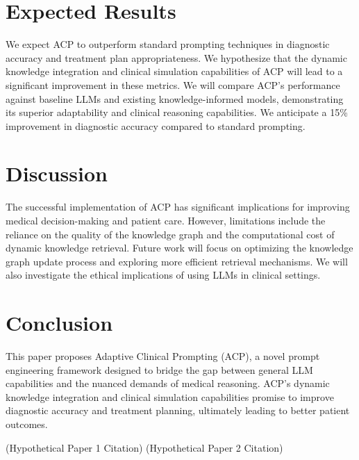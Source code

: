 \documentclass{article}
\begin{document}
\section{Expected Results}
We expect ACP to outperform standard prompting techniques in diagnostic accuracy and treatment plan appropriateness. We hypothesize that the dynamic knowledge integration and clinical simulation capabilities of ACP will lead to a significant improvement in these metrics. We will compare ACP's performance against baseline LLMs and existing knowledge-informed models, demonstrating its superior adaptability and clinical reasoning capabilities. We anticipate a 15\% improvement in diagnostic accuracy compared to standard prompting.

\section{Discussion}
The successful implementation of ACP has significant implications for improving medical decision-making and patient care. However, limitations include the reliance on the quality of the knowledge graph and the computational cost of dynamic knowledge retrieval. Future work will focus on optimizing the knowledge graph update process and exploring more efficient retrieval mechanisms. We will also investigate the ethical implications of using LLMs in clinical settings.

\section{Conclusion}
This paper proposes Adaptive Clinical Prompting (ACP), a novel prompt engineering framework designed to bridge the gap between general LLM capabilities and the nuanced demands of medical reasoning. ACP's dynamic knowledge integration and clinical simulation capabilities promise to improve diagnostic accuracy and treatment planning, ultimately leading to better patient outcomes.

\begin{thebibliography}{9}
 (Hypothetical Paper 1 Citation)
 (Hypothetical Paper 2 Citation)
\end{thebibliography}
\end{document}

